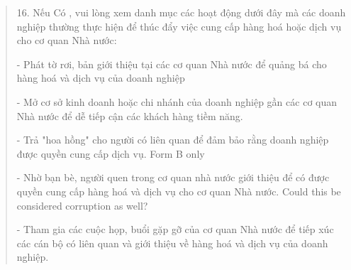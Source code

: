 \documentclass{article}\usepackage[]{graphicx}\usepackage[]{color}
\begin{document}
\begin{quote}
16. Nếu Có , vui lòng xem danh mục các hoạt động dưới đây mà các doanh nghiệp thường thực hiện để thúc đẩy việc cung cấp hàng hoá hoặc dịch vụ cho cơ quan Nhà nước: 

- Phát tờ rơi, bản giới thiệu tại các cơ quan Nhà nước để quảng bá cho hàng hoá và dịch vụ của doanh nghiệp

- Mở cơ sở kinh doanh hoặc chi nhánh của doanh nghiệp gần các cơ quan Nhà nước để dễ tiếp cận các khách hàng tiềm năng.

{\color{red}- Trả "hoa hồng" cho người có liên quan để đảm bảo rằng doanh nghiệp được quyền cung cấp dịch vụ. Form B only}

{\color{blue}- Nhờ bạn bè, người quen trong cơ quan nhà nước giới thiệu để có được quyền cung cấp hàng hoá và dịch vụ cho cơ quan Nhà nước. Could this be considered corruption as well?}

- Tham gia các cuộc họp, buổi gặp gỡ của cơ quan Nhà nước để tiếp xúc các cán bộ có liên quan và giới thiệu về hàng hoá và dịch vụ của doanh nghiệp.
\end{quote}
\end{document}
